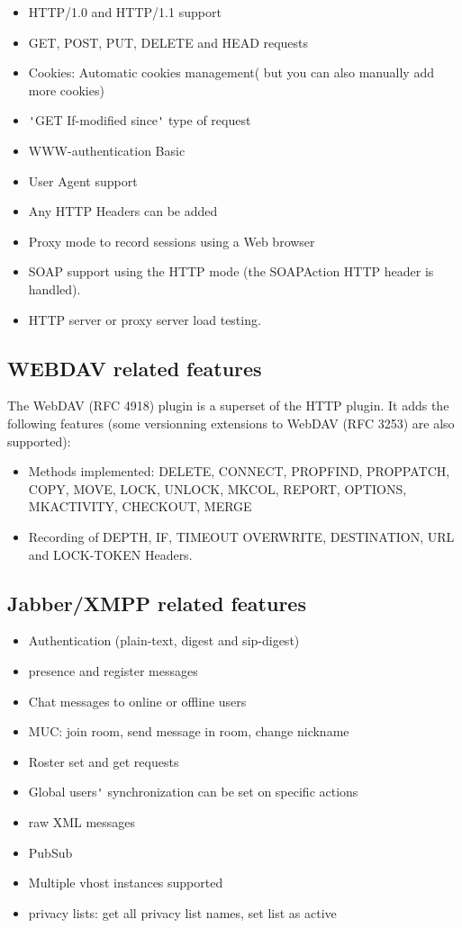 \documentclass{TSUNG-en}
\begin{document}
\begin{itemize}
\item HTTP/1.0 and HTTP/1.1 support
\item GET, POST, PUT, DELETE and HEAD requests
\item Cookies: Automatic cookies management( but you can also manually
  add more cookies)
\item \verb|'|GET If-modified since\verb|'| type of request
\item WWW-authentication Basic
\item User Agent support
\item Any HTTP Headers can be added
\item Proxy mode to record sessions using a Web browser
\item SOAP support using the HTTP mode (the SOAPAction HTTP header is
  handled).
\item HTTP server or proxy server load testing.
\end{itemize}

\subsection{WEBDAV related features}

The WebDAV (RFC 4918) plugin is a superset of the HTTP plugin. It adds the
following features (some versionning extensions to WebDAV (RFC 3253)
are also supported):

\begin{itemize}
\item Methods implemented: DELETE, CONNECT, PROPFIND, PROPPATCH, COPY,
  MOVE, LOCK, UNLOCK, MKCOL, REPORT, OPTIONS, MKACTIVITY, CHECKOUT, MERGE
\item Recording of DEPTH, IF, TIMEOUT OVERWRITE, DESTINATION, URL and
  LOCK-TOKEN Headers.
\end{itemize}

\subsection{Jabber/XMPP related features}

\begin{itemize}
\item Authentication (plain-text, digest and sip-digest)
\item presence and register messages
\item Chat messages to online or offline users
\item MUC: join room, send message in room, change nickname
\item Roster set and get requests
\item Global users\verb|'| synchronization can be set on specific actions
\item raw XML messages
\item PubSub
\item Multiple vhost instances supported
\item privacy lists: get all privacy list names, set list as active
\end{itemize}
\end{document}
